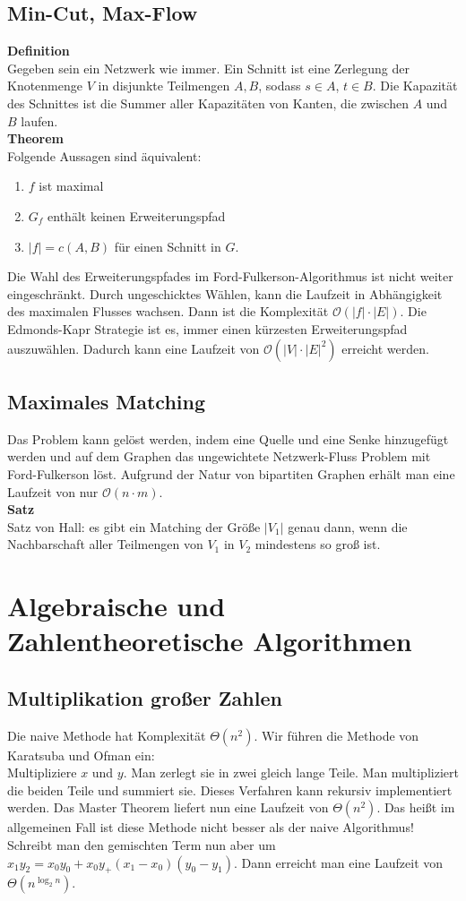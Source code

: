 \documentclass[a4paper, 12pt]{article}
\begin{document}
	\subsection{Min-Cut, Max-Flow}
	\textbf{Definition}\\
	Gegeben sein ein Netzwerk wie immer. Ein Schnitt ist eine Zerlegung der Knotenmenge $V$ in disjunkte Teilmengen $A,B$, sodass $s \in A$, $t \in B$. Die Kapazität des Schnittes ist die Summer aller Kapazitäten von Kanten, die zwischen $A$ und $B$ laufen.\\
	\textbf{Theorem}\\
	Folgende Aussagen sind äquivalent: \begin{enumerate}
		\item $f$ ist maximal
		\item $G_f$ enthält keinen Erweiterungspfad
		\item $\left|f\right| = c(A,B)$ für einen Schnitt in $G$.
	\end{enumerate}
	Die Wahl des Erweiterungspfades im Ford-Fulkerson-Algorithmus ist nicht weiter eingeschränkt. Durch ungeschicktes Wählen, kann die Laufzeit in Abhängigkeit des maximalen Flusses wachsen. Dann ist die Komplexität $\mathcal{O}(\left|f\right|\cdot \left|E\right|)$. Die Edmonds-Kapr Strategie ist es, immer einen kürzesten Erweiterungspfad auszuwählen. Dadurch kann eine Laufzeit von $\mathcal{O}(\left|V\right|\cdot \left|E\right|^2)$ erreicht werden.\
	\subsection{Maximales Matching}
	Das Problem kann gelöst werden, indem eine Quelle und eine Senke hinzugefügt werden und auf dem Graphen das ungewichtete Netzwerk-Fluss Problem mit Ford-Fulkerson löst. Aufgrund der Natur von bipartiten Graphen erhält man eine Laufzeit von nur $\mathcal{O}(n\cdot m)$.\\
	\textbf{Satz}\\
	Satz von Hall: es gibt ein Matching der Größe $\left|V_1\right|$ genau dann, wenn die Nachbarschaft aller Teilmengen von $V_1$ in $V_2$ mindestens so groß ist.
	\section{Algebraische und Zahlentheoretische Algorithmen}
	\subsection{Multiplikation großer Zahlen}
	Die naive Methode hat Komplexität $\Theta(n^2)$. Wir führen die Methode von Karatsuba und Ofman ein:\\
	Multipliziere $x$ und $y$. Man zerlegt sie in zwei gleich lange Teile. Man multipliziert die beiden Teile und summiert sie. Dieses Verfahren kann rekursiv implementiert werden. Das Master Theorem liefert nun eine Laufzeit von $\Theta(n^2)$. Das heißt im allgemeinen Fall ist diese Methode nicht besser als der naive Algorithmus!\\
	Schreibt man den gemischten Term nun aber um $x_1y_2 = x_0y_0 + x_0y_ + (x_1-x_0)(y_0-y_1)$. Dann erreicht man eine Laufzeit von $\Theta(n^{\log_2 n})$.
\end{document}
